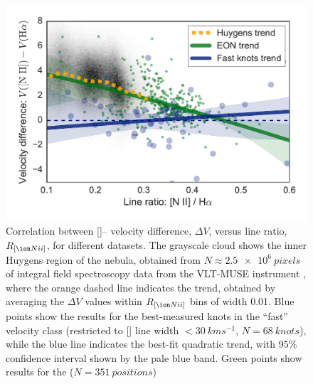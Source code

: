 \documentclass[usenatbib]{mnras}
\begin{document}
\begin{figure}
  \centering
  \includegraphics[width=\linewidth]{knot-dv-versus-nii-ha-ratio}
  \caption{Correlation between [\nii]--\ha{} velocity difference,
    \(\Delta V\), versus line ratio, \(R_{[\nii]}\), for different
    datasets. The grayscale cloud shows the inner Huygens region of
    the nebula, obtained from \(N \approx \SI{2.5e6}{pixels}\) of
    integral field spectroscopy data from the VLT-MUSE instrument
    \citet{MUSE}, where the orange dashed line indicates the trend,
    obtained by averaging the \(\Delta V\) values within
    \(R_{[\nii]}\) bins of width 0.01.  Blue points show the results
    for the best-measured knots in the ``fast'' velocity class
    (restricted to [\nii] line width \(< \SI{30}{km s^{-1}}\),
    \(N = \SI{68}{knots}\)), while the blue line indicates the
    best-fit quadratic trend, with 95\% confidence interval shown by
    the pale blue band.  Green points show results for the
    (\(N = \SI{351}{positions}\))}
\end{figure}



\end{document}
